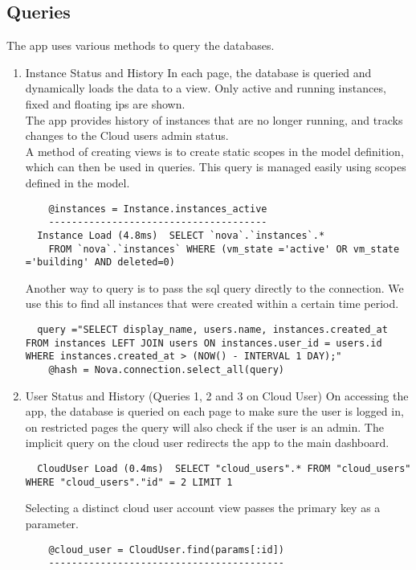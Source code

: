 \documentclass[12pt]{article}
\begin{document}
\subsection{Queries}
The app uses various methods to query the databases.\\
\begin{enumerate}
\item Instance Status and History
In each page, the database is queried and dynamically loads the data to a view.
Only active and running instances, fixed and floating ips are shown.\\
The app provides history of instances that are no longer running, and tracks changes to the Cloud users admin status.\\ 
A method of creating views is to create static scopes in the model definition, which can then be used in queries.
This query is managed easily using scopes defined in the model.\\
\begin{lstlisting}
    @instances = Instance.instances_active
    --------------------------------------
  Instance Load (4.8ms)  SELECT `nova`.`instances`.*
    FROM `nova`.`instances` WHERE (vm_state ='active' OR vm_state ='building' AND deleted=0)
\end{lstlisting}
Another way to query is to pass the sql query directly to the connection. We use this to find all instances that were created within a certain time period.
\begin{lstlisting}
  query ="SELECT display_name, users.name, instances.created_at FROM instances LEFT JOIN users ON instances.user_id = users.id WHERE instances.created_at > (NOW() - INTERVAL 1 DAY);"
    @hash = Nova.connection.select_all(query)
\end{lstlisting}
\item User Status and History
(Queries 1, 2 and 3 on Cloud User)
On accessing the app, the database is queried on each page to make sure the user is logged in, on restricted pages the query will also check if the user is an admin. The implicit query on the cloud user redirects the app to the main dashboard.
\begin{lstlisting}
  CloudUser Load (0.4ms)  SELECT "cloud_users".* FROM "cloud_users" WHERE "cloud_users"."id" = 2 LIMIT 1
\end{lstlisting}
Selecting a distinct cloud user account view passes the primary key as a parameter.
\begin{lstlisting}
    @cloud_user = CloudUser.find(params[:id])
    -----------------------------------------

\end{lstlisting}
\end{enumerate}
\end{document}
